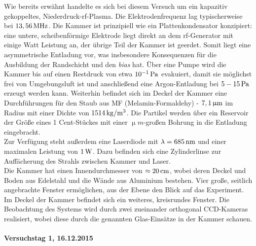 \documentclass[numbers=noenddot,a4paper,notitlepage,twoside,BCOR15mm]{scrartcl}
\newcommand{\tenpo}[1]{ 10^{#1}}
\newcommand{\tilt}[1]{\textit{#1}}
\begin{document}
		Wie bereits erwähnt handelte es sich bei diesem Versuch um ein kapazitiv gekoppeltes, Niederdruck-rf-Plasma. Die Elektrodenfrequenz lag typischerweise bei $\unit[13,56]{MHz}$. Die Kammer ist prinzipiell wie ein Plattenkondensator konzipiert: eine untere, scheibenförmige Elektrode liegt direkt an dem rf-Generator mit einige Watt Leistung an, der übrige Teil der Kammer ist geerdet. Somit liegt eine asymmetrische Entladung vor, was insbesondere Konsequenzen für die Ausbildung der Randschicht und den \tilt{bias} hat. \"Uber eine Pumpe wird die Kammer bis auf einen Restdruck von etwa $\unit[\tenpo{-1}]{Pa}$ evakuiert, damit sie m\"oglichst frei von Umgebungsluft ist und anschlie{\ss}end eine Argon-Entladung bei $\unit[5-15]{Pa}$ erzeugt werden kann.
		Weiterhin befindet sich im Deckel der Kammer eine Durchf\"uhrungen f\"ur den Staub aus MF (Melamin-Formaldehy) - $\unit[7,1]{\upmu m}$ im Radius  mit einer Dichte von $\unit[1514]{kg/m^3}$. Die Partikel werden \"uber ein Reservoir der Gr\"o{\ss}e eines 1 Cent-St\"uckes mit einer $\unit{\upmu m}$-gro{\ss}en Bohrung in die Entladung eingebracht.\\
		Zur Verfügung steht außerdem eine Laserdiode mit $\lambda=\unit[685]{nm}$ und einer maximalen Leistung von $\unit[1]{W}$. Dazu befinden sich eine Zylinderlinse zur Auffächerung des Strahls zwischen Kammer und Laser.\\
		Die Kammer hat einen Innendurchmesser von $\approx\unit[20]{cm}$, wobei deren Deckel und Boden aus Edelstahl und die Wände aus Aluminium bestehen. Vier gro{\ss}e, seitlich angebrachte Fenster erm\"oglichen,  aus der Ebene den Blick auf das Experiment. Im Deckel der Kammer befindet sich ein weiteres, kreisrundes Fenster. Die Beobachtung des Systems wird durch zwei zueinander orthogonal CCD-Kameras realisiert, wobei diese durch die genannten Glas-Einsätze in der Kammer schauen.

		\paragraph{Versuchstag 1, 16.12.2015}
\end{document}
